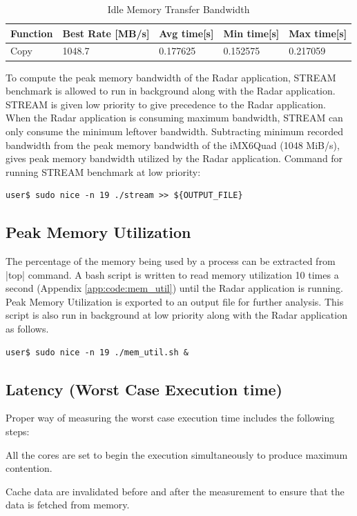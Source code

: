\begin{table}[h!]
	\centering
	\begin{tabular}{|l|l|l|l|l|} 
	 \hline
	 \textbf{Function} & \textbf{Best Rate [MB/s]} & \textbf{Avg time[s]} & \textbf{Min time[s]} & \textbf{Max time[s]} \\
	 \hline
	 Copy & 1048.7 & 0.177625 & 0.152575 & 0.217059 \\ \hline
	\end{tabular}
	\caption{Idle Memory Transfer Bandwidth}
	\label{tbl:mm:bw_no_load}
\end{table}

To compute the peak memory bandwidth of the Radar application, STREAM benchmark is allowed to run in background along with the Radar application. STREAM is given low priority to give precedence to the Radar application. When the Radar application is consuming maximum bandwidth, STREAM can only consume the minimum leftover bandwidth. Subtracting minimum recorded bandwidth from the peak memory bandwidth of the iMX6Quad (1048 MiB/s), gives peak memory bandwidth utilized by the Radar application. Command for running STREAM benchmark at low priority: \\
\begin{lstlisting}
user$ sudo nice -n 19 ./stream >> ${OUTPUT_FILE}
\end{lstlisting}

\subsection{Peak Memory Utilization}
\label{ss:mm:mem_util}
The percentage of the memory being used by a process can be extracted from \bverb|top| command. A bash script is written to read memory utilization 10 times a second (Appendix \ref{app:code:mem_util}) until the Radar application is running. Peak Memory Utilization is exported to an output file for further analysis. This script is also run in background at low priority along with the Radar application as follows.\\
\begin{lstlisting}
user$ sudo nice -n 19 ./mem_util.sh &
\end{lstlisting}

\subsection{Latency (Worst Case Execution time)}
\label{ss:mm:latency}
Proper way of measuring the worst case execution time includes the following steps:
\begin{compactitem} 
	\item All the cores are set to begin the execution simultaneously to produce maximum contention.
	\item Cache data are invalidated before and after the measurement to ensure that the data is fetched from memory.
\end{compactitem} 

